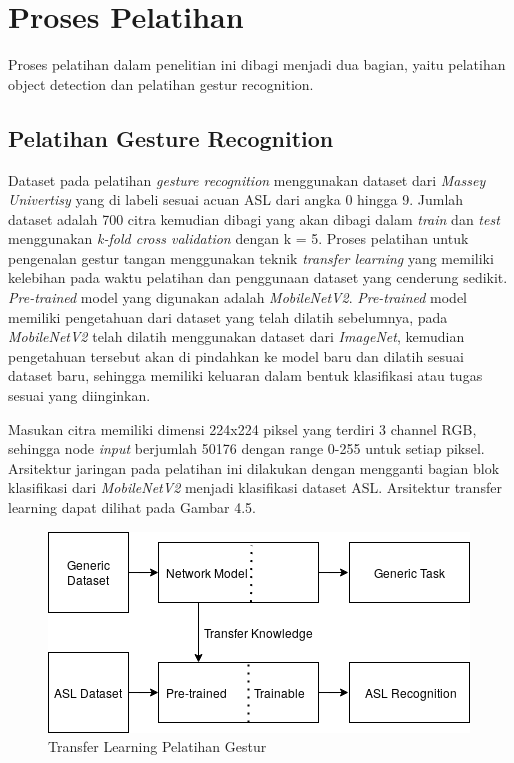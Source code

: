 \section{Proses Pelatihan}
Proses pelatihan dalam penelitian ini dibagi menjadi dua bagian, yaitu pelatihan object detection dan pelatihan gestur recognition.
\subsection{Pelatihan Gesture Recognition}
Dataset pada pelatihan \emph{gesture recognition} menggunakan dataset dari \emph{Massey Univertisy} yang di labeli sesuai acuan ASL dari angka 0 hingga 9. Jumlah dataset adalah 700 citra kemudian dibagi yang akan dibagi dalam \emph{train} dan \emph{test} menggunakan \emph{k-fold cross validation} dengan k = 5.
Proses pelatihan untuk pengenalan gestur tangan menggunakan teknik \emph{transfer learning} yang memiliki kelebihan pada waktu pelatihan dan penggunaan dataset yang cenderung sedikit. \emph{Pre-trained} model yang digunakan adalah \emph{MobileNetV2}. \emph{Pre-trained} model memiliki pengetahuan dari dataset yang telah dilatih sebelumnya, pada \emph{MobileNetV2} telah dilatih menggunakan dataset dari \emph{ImageNet}, kemudian pengetahuan tersebut akan di pindahkan ke model baru dan dilatih sesuai dataset baru, sehingga memiliki keluaran dalam bentuk klasifikasi atau tugas sesuai yang diinginkan.

Masukan citra memiliki dimensi 224x224 piksel yang terdiri 3 channel RGB, sehingga node \emph{input} berjumlah 50176 dengan range 0-255 untuk setiap piksel. Arsitektur jaringan pada pelatihan ini dilakukan dengan mengganti bagian blok klasifikasi dari \emph{MobileNetV2} menjadi klasifikasi dataset ASL. 
Arsitektur transfer learning dapat dilihat pada Gambar 4.5.
\begin{figure}[H]
	\centering
	\includegraphics[width=0.8\linewidth]{transfer}
	\caption{Transfer Learning Pelatihan Gestur}
	\label{fig:asritrkturku}
\end{figure}

